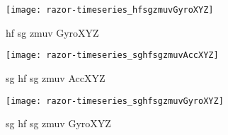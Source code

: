 \documentclass[a4paper,12pt]{article}
\begin{document}
\begin{figure}
\centering
\texttt{[image: razor-timeseries\_hfsgzmuvGyroXYZ]}
\caption{ hf sg zmuv GyroXYZ}
\end{figure}




\begin{figure}
\centering
\texttt{[image: razor-timeseries\_sghfsgzmuvAccXYZ]}
\caption{sg hf sg zmuv AccXYZ}
\end{figure}




\begin{figure}
\centering
\texttt{[image: razor-timeseries\_sghfsgzmuvGyroXYZ]}
\caption{sg hf sg zmuv GyroXYZ}
\end{figure}
\end{document}
